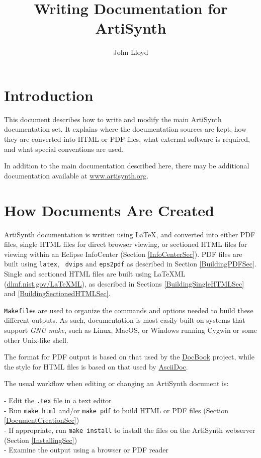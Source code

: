 \documentclass{article}
\title{Writing Documentation for ArtiSynth}
\author{John Lloyd}
\date{}
\begin{document}
\maketitle

\iflatexml{\large\pubdate}\fi

\tableofcontents

\section{Introduction}

This document describes how to write and modify the main ArtiSynth
documentation set. It explains where the documentation sources are
kept, how they are converted into HTML or PDF files, what external
software is required, and what special conventions are used.

In addition to the main documentation described here, there may be
additional documentation available at
\href{http://www.artisynth.org}{www.artisynth.org}.

\section{How Documents Are Created}

ArtiSynth documentation is written using LaTeX, and converted into
either PDF files, single HTML files for direct browser viewing, or
sectioned HTML files for viewing within an Eclipse InfoCenter (Section
\ref{InfoCenterSec}). PDF files are built using {\tt latex}, {\tt
dvips} and {\tt eps2pdf} as described in Section
\ref{BuildingPDFSec}. Single and sectioned HTML files are built
using LaTeXML
(\href{http://dlmf.nist.gov/LaTeXML/}{dlmf.nist.gov/LaTeXML}), as
described in Sections \ref{BuildingSingleHTMLSec} and \ref{BuildingSectionedHTMLSec}.

{\tt Makefile}s are used to organize the commands and options needed
to build these different outputs. As such, documentation is most
easily built on systems that support {\it GNU make}, such as
Linux, MacOS, or Windows running Cygwin or some other Unix-like shell.

The format for PDF output is based on that used by the
\href{http://www.docbook.org}{DocBook} project, while the style for
HTML files is based on that used by
\href{http://www.methods.co.nz/asciidoc}{AsciiDoc}.

\begin{sideblock}
The usual workflow when editing or changing an ArtiSynth document is:

- Edit the {\tt .tex} file in a text editor\\
- Run {\tt make html} and/or {\tt make pdf} to build HTML
or PDF files (Section \ref{DocumentCreationSec})\\
- If appropriate, run {\tt make install} to install the files on the
ArtiSynth webserver (Section \ref{InstallingSec})\\
- Examine the output using a browser or PDF reader
\end{sideblock}
\end{document}
